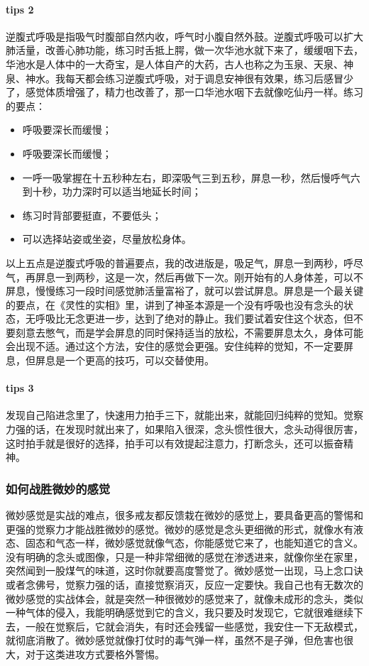 \paragraph{tips 2} 逆腹式呼吸是指吸气时腹部自然内收，呼气时小腹自然外鼓。逆腹式呼吸可以扩大肺活量，改善心肺功能，练习时舌抵上腭，做一次华池水就下来了，缓缓咽下去，华池水是人体中的一大奇宝，是人体自产的大药，古人也称之为玉泉、天泉、神泉、神水。我每天都会练习逆腹式呼吸，对于调息安神很有效果，练习后感冒少了，感觉体质增强了，精力也改善了，那一口华池水咽下去就像吃仙丹一样。练习的要点：\begin{multicols}{2}
    \begin{itemize}
        \item 呼吸要深长而缓慢；
        \item 呼吸要深长而缓慢；
        \item 一呼一吸掌握在十五秒种左右，即深吸气三到五秒，屏息一秒，然后慢呼气六到十秒，功力深时可以适当地延长时间；
        \item 练习时背部要挺直，不要低头；
        \item 可以选择站姿或坐姿，尽量放松身体。
    \end{itemize}
\end{multicols} 以上五点是逆腹式呼吸的普遍要点，我的改进版是，吸足气，屏息一到两秒，呼尽气，再屏息一到两秒，这是一次，然后再做下一次。刚开始有的人身体差，可以不屏息，慢慢练习一段时间感觉肺活量富裕了，就可以尝试屏息。屏息是一个最关键的要点，在《灵性的实相》里，讲到了神圣本源是一个没有呼吸也没有念头的状态，无呼吸比无念更进一步，达到了绝对的静止。我们要试着安住这个状态，但不要刻意去憋气，而是学会屏息的同时保持适当的放松，不需要屏息太久，身体可能会出现不适。通过这个方法，安住的感觉会更强。安住纯粹的觉知，不一定要屏息，但屏息是一个更高的技巧，可以交替使用。

\paragraph{tips 3} 发现自己陷进念里了，快速用力拍手三下，就能出来，就能回归纯粹的觉知。觉察力强的话，在发现时就出来了，如果陷入很深，念头惯性很大，念头动得很厉害，这时拍手就是很好的选择，拍手可以有效提起注意力，打断念头，还可以振奋精神。

\subsubsection{如何战胜微妙的感觉}

微妙感觉是实战的难点，很多戒友都反馈栽在微妙的感觉上，要具备更高的警惕和更强的觉察力才能战胜微妙的感觉。微妙的感觉是念头更细微的形式，就像水有液态、固态和气态一样，微妙感觉就像气态，你能感觉它来了，也能知道它的含义。没有明确的念头或图像，只是一种非常细微的感觉在渗透进来，就像你坐在家里，突然闻到一股煤气的味道，这时你就要高度警觉了。微妙感觉一出现，马上念口诀或者念佛号，觉察力强的话，直接觉察消灭，反应一定要快。我自己也有无数次的微妙感觉的实战体会，就是突然一种很微妙的感觉来了，就像未成形的念头，类似一种气体的侵入，我能明确感觉到它的含义，我只要及时发现它，它就很难继续下去，一般在觉察后，它就会消失，有时还会残留一些感觉，我安住一下无敌模式，就彻底消散了。微妙感觉就像打仗时的毒气弹一样，虽然不是子弹，但危害也很大，对于这类进攻方式要格外警惕。

